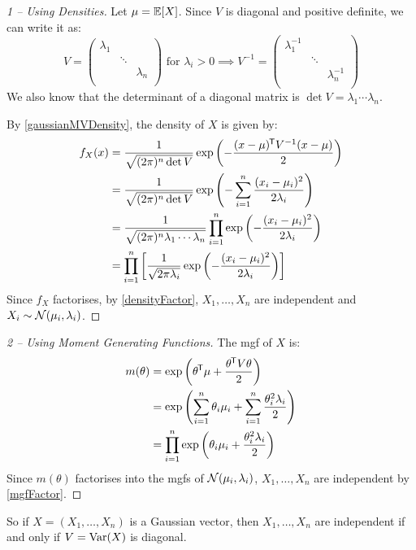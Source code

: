 \documentclass[../main.tex]{subfiles}
\begin{document}
\begin{proof}[1 -- Using Densities]
  Let $\mu = \mathbb{E}[X]$.
  Since $V$ is diagonal and positive definite, we can write it as:
  \[
    V = \begin{pmatrix}
    \lambda_1 &  &  \\
     & \ddots &  \\
     &  & \lambda_n \\
    \end{pmatrix} \text{ for } \lambda_i > 0 \implies V^{-1} = \begin{pmatrix}
    \lambda^{-1}_1 &  &  \\
     & \ddots &  \\
     &  & \lambda^{-1}_n \\
    \end{pmatrix}
  \]
  We also know that the determinant of a diagonal matrix is $\det V = \lambda_1 \cdots \lambda_n$.

  By \cref{gaussianMVDensity}, the density of $X$ is given by:
  \begin{align*}
    f_{X}(x) &= \frac{1}{\sqrt{(2\pi)^{n} \det V}}\exp\left(- \frac{(x - \mu)^{{\mkern-1.5mu\mathsf{T}}}V^{-1}(x - \mu)}{2}\right) \\
             &= \frac{1}{\sqrt{(2\pi)^{n} \det V}} \exp\left(- \sum_{i = 1}^{n} \frac{(x_i - \mu_i)^2}{2\lambda_i}\right) \\
             &= \frac{1}{\sqrt{(2\pi)^{n} \lambda_1 \cdots \lambda_n}} \prod_{i = 1}^{n} \exp\left(-\frac{(x_i-\mu_i)^2}{2\lambda_i}\right) \\
             &= \prod_{i = 1}^{n} \left[\frac{1}{\sqrt{2\pi \lambda_i}}\exp\left(-\frac{(x_i - \mu_i)^2}{2\lambda_i}\right)\right]
  \end{align*}
  Since $f_X$ factorises, by \cref{densityFactor}, $X_1, \ldots, X_n$ are independent and $X_i \sim \operatorname{\mathcal{N}}(\mu_i, \lambda_i)$.
\end{proof}
\begin{proof}[2 -- Using Moment Generating Functions]
  The mgf of $X$ is:
  \begin{align*}
    m(\theta) &= \exp\left(\theta^{{\mkern-1.5mu\mathsf{T}}} \mu + \frac{\theta^{{\mkern-1.5mu\mathsf{T}}} V \theta}{2}\right) \\
              &= \exp\left(\sum_{i = 1}^{n} \theta_i \mu_i + \sum_{i = 1}^{n} \frac{\theta_i^2 \lambda_i}{2}\right) \\
              &= \prod_{i = 1}^{n} \exp\left(\theta_i \mu_i + \frac{\theta_i^2 \lambda_i}{2}\right)
  \end{align*}
  Since $m(\theta)$ factorises into the mgfs of $\operatorname{\mathcal{N}}(\mu_i, \lambda_i)$, $X_1, \ldots, X_n$ are independent by \cref{mgfFactor}.
\end{proof}
\begin{remark}
  So if $X = (X_1, \ldots, X_n)$ is a Gaussian vector, then $X_1, \ldots, X_n$ are independent if and only if $V = \operatorname{Var}(X)$ is diagonal.
\end{remark}
\end{document}
